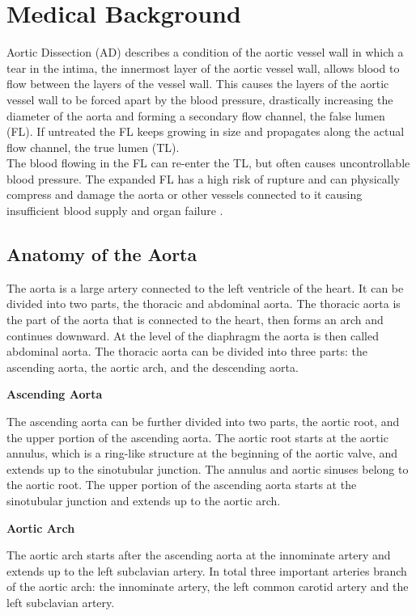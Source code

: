 \documentclass[thesis.tex]{subfiles}
\begin{document}
\section{Medical Background}
Aortic Dissection (AD) describes a condition of the aortic vessel wall in which a tear in the intima, the innermost layer of the aortic vessel wall, allows blood to flow between the layers of the vessel wall. This causes the layers of the aortic vessel wall to be forced apart by the blood pressure, drastically increasing the diameter of the aorta and forming a secondary flow channel, the false lumen (FL). If untreated the FL keeps growing in size and propagates along the actual flow channel, the true lumen (TL). \\
The blood flowing in the FL can re-enter the TL, but often causes uncontrollable blood pressure. The expanded FL has a high risk of rupture and can physically compress\cite{criado2011aortic} and damage the aorta or other vessels connected to it causing insufficient blood supply and organ failure \cite{meszaros2000epidemiology,desanctis1987aortic}. 

\subsection{Anatomy of the Aorta}
The aorta is a large artery connected to the left ventricle of the heart. It can be divided into two parts, the thoracic and abdominal aorta. The thoracic aorta is the part of the aorta that is connected to the heart, then forms an arch and continues downward. At the level of the diaphragm the aorta is then called abdominal aorta. The thoracic aorta can be divided into three parts: the ascending aorta, the aortic arch, and the descending aorta.

\textbf{Ascending Aorta}

The ascending aorta can be further divided into two parts, the aortic root, and the upper portion of the ascending aorta. 
The aortic root starts at the aortic annulus, which is a ring-like structure at the beginning of the aortic valve, and extends up to the sinotubular junction. The annulus and aortic sinuses belong to the aortic root. The upper portion of the ascending aorta starts at the sinotubular junction and extends up to the aortic arch.

\textbf{Aortic Arch}

The aortic arch starts after the ascending aorta at the innominate artery and extends up to the left subclavian artery. In total three important arteries branch of the aortic arch: the innominate artery, the left common carotid artery and the left subclavian artery. 
\end{document}
